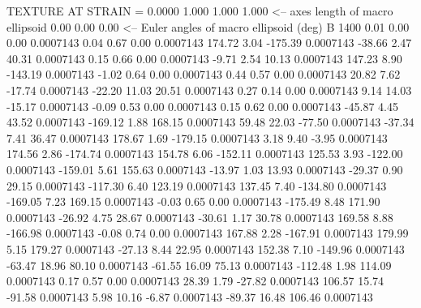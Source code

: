 TEXTURE AT STRAIN =    0.0000
   1.000   1.000   1.000  <-- axes length of macro ellipsoid
    0.00    0.00    0.00  <-- Euler angles of macro ellipsoid (deg)
B      1400
        0.01        0.00        0.00     0.0007143
        0.04        0.67        0.00     0.0007143
      174.72        3.04     -175.39     0.0007143
      -38.66        2.47       40.31     0.0007143
        0.15        0.66        0.00     0.0007143
       -9.71        2.54       10.13     0.0007143
      147.23        8.90     -143.19     0.0007143
       -1.02        0.64        0.00     0.0007143
        0.44        0.57        0.00     0.0007143
       20.82        7.62      -17.74     0.0007143
      -22.20       11.03       20.51     0.0007143
        0.27        0.14        0.00     0.0007143
        9.14       14.03      -15.17     0.0007143
       -0.09        0.53        0.00     0.0007143
        0.15        0.62        0.00     0.0007143
      -45.87        4.45       43.52     0.0007143
     -169.12        1.88      168.15     0.0007143
       59.48       22.03      -77.50     0.0007143
      -37.34        7.41       36.47     0.0007143
      178.67        1.69     -179.15     0.0007143
        3.18        9.40       -3.95     0.0007143
      174.56        2.86     -174.74     0.0007143
      154.78        6.06     -152.11     0.0007143
      125.53        3.93     -122.00     0.0007143
     -159.01        5.61      155.63     0.0007143
      -13.97        1.03       13.93     0.0007143
      -29.37        0.90       29.15     0.0007143
     -117.30        6.40      123.19     0.0007143
      137.45        7.40     -134.80     0.0007143
     -169.05        7.23      169.15     0.0007143
       -0.03        0.65        0.00     0.0007143
     -175.49        8.48      171.90     0.0007143
      -26.92        4.75       28.67     0.0007143
      -30.61        1.17       30.78     0.0007143
      169.58        8.88     -166.98     0.0007143
       -0.08        0.74        0.00     0.0007143
      167.88        2.28     -167.91     0.0007143
      179.99        5.15      179.27     0.0007143
      -27.13        8.44       22.95     0.0007143
      152.38        7.10     -149.96     0.0007143
      -63.47       18.96       80.10     0.0007143
      -61.55       16.09       75.13     0.0007143
     -112.48        1.98      114.09     0.0007143
        0.17        0.57        0.00     0.0007143
       28.39        1.79      -27.82     0.0007143
      106.57       15.74      -91.58     0.0007143
        5.98       10.16       -6.87     0.0007143
      -89.37       16.48      106.46     0.0007143
